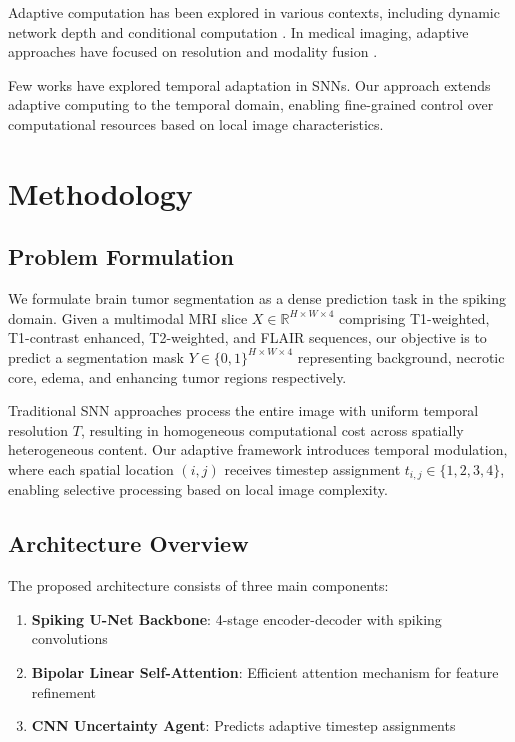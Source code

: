 \documentclass[12pt,a4paper]{article}
\begin{document}
Adaptive computation has been explored in various contexts, including dynamic network depth \cite{huang2018multi} and conditional computation \cite{bengio2015conditional}. In medical imaging, adaptive approaches have focused on resolution \cite{wang2021dynamic} and modality fusion \cite{myronenko20183d}.

Few works have explored temporal adaptation in SNNs. Our approach extends adaptive computing to the temporal domain, enabling fine-grained control over computational resources based on local image characteristics.

\newpage
\section{Methodology}

\subsection{Problem Formulation}

We formulate brain tumor segmentation as a dense prediction task in the spiking domain. Given a multimodal MRI slice $X \in \mathbb{R}^{H \times W \times 4}$ comprising T1-weighted, T1-contrast enhanced, T2-weighted, and FLAIR sequences, our objective is to predict a segmentation mask $Y \in \{0,1\}^{H \times W \times 4}$ representing background, necrotic core, edema, and enhancing tumor regions respectively.

Traditional SNN approaches process the entire image with uniform temporal resolution $T$, resulting in homogeneous computational cost across spatially heterogeneous content. Our adaptive framework introduces temporal modulation, where each spatial location $(i,j)$ receives timestep assignment $t_{i,j} \in \{1, 2, 3, 4\}$, enabling selective processing based on local image complexity.

\subsection{Architecture Overview}

The proposed architecture consists of three main components:

\begin{enumerate}
\item \textbf{Spiking U-Net Backbone}: 4-stage encoder-decoder with spiking convolutions
\item \textbf{Bipolar Linear Self-Attention}: Efficient attention mechanism for feature refinement
\item \textbf{CNN Uncertainty Agent}: Predicts adaptive timestep assignments
\end{enumerate}
\end{document}
